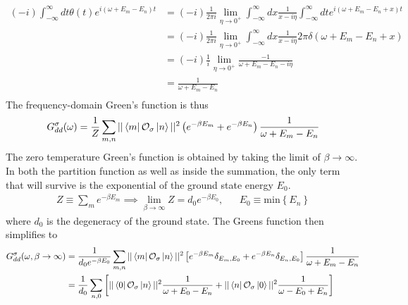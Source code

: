 \documentclass[10pt]{report}
\numberwithin{equation}{section}
\begin{document}
\begin{appendices}
\begin{equation}
\begin{aligned}
	\left(-i\right)\int_{-\infty}^\infty dt \theta(t)e^{i\left( \omega + E_m - E_n \right)t} &= \left(-i\right)\frac{1}{2\pi i}\lim_{\eta \to 0^+} \int_{-\infty}^\infty dx\frac{1}{x- i\eta}\int_{-\infty}^\infty dt e^{i\left( \omega + E_m - E_n + x\right)t} \\
									     &=\left(-i\right)\frac{1}{2\pi i}\lim_{\eta \to 0^+} \int_{-\infty}^\infty dx\frac{1}{x- i\eta} 2\pi \delta\left( \omega + E_m - E_n + x\right) \\
									     &=\left(-i\right)\frac{1}{i}\lim_{\eta \to 0^+} \frac{-1}{\omega + E_m - E_n- i\eta} \\
									     &=\frac{1}{\omega + E_m - E_n} \\
\end{aligned}\end{equation}
The frequency-domain Green's function is thus
\begin{equation}\begin{aligned}
	G_{d d}^\sigma(\omega) = \frac{1}{Z}\sum_{m,n}||\bra{m}\mathcal{O}_{\sigma}\ket{n}||^2\left( e^{-\beta E_m} + e^{-\beta E_n}\right)\frac{1}{\omega + E_m - E_n}
\end{aligned}\end{equation}
The zero temperature Green's function is obtained by taking the limit of \(\beta \to \infty\). In both the partition function as well as inside the summation, the only term that will survive is the exponential of the ground state energy \(E_0\).
\begin{equation*}\begin{aligned}
	Z \equiv \sum_m e^{-\beta E_m} \implies \lim_{\beta \to \infty}Z = d_0 e^{-\beta E_0}, && E_0 \equiv \text{min}\left\{ E_n \right\} 
\end{aligned}\end{equation*}
where \(d_0\) is the degeneracy of the ground state. The Greens function then simplifies to
\begin{equation}\begin{aligned}
	\label{Gf_lk}
	G_{d d}^\sigma(\omega, \beta \to \infty) &= \frac{1}{d_0e^{-\beta E_0}}\sum_{m,n}||\bra{m}\mathcal{O}_{\sigma}\ket{n}||^2\left[e^{-\beta E_m}\delta_{E_m, E_0} + e^{-\beta E_n}\delta_{E_n, E_0}\right]\frac{1}{\omega + E_m - E_n}\\
						 &= \frac{1}{d_0}\sum_{n,0}\left[||\bra{0}\mathcal{O}_{\sigma}\ket{n}||^2\frac{1}{\omega + E_0 - E_n} + ||\bra{n}\mathcal{O}_{\sigma}\ket{0}||^2\frac{1}{\omega - E_0 + E_n}\right]\\
\end{aligned}\end{equation}

\end{appendices}
\end{document}
